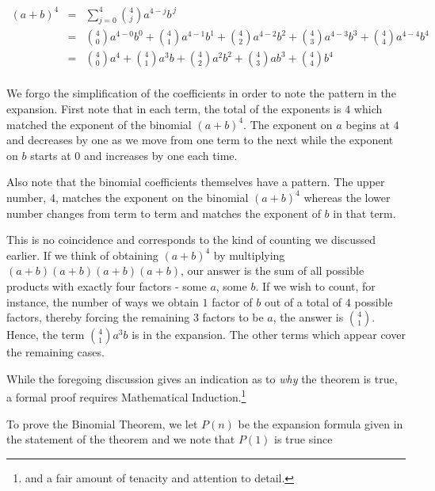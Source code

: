 \documentclass{ximera}
\begin{document}
\[ \begin{array}{rcl}

(a+b)^{4} & = & \displaystyle{\sum_{j=0}^{4} \binom{4}{j} a^{4-j} b^{\, j}} \\  
          & = & \displaystyle{\binom{4}{0}a^{4-0}b^{0} + \binom{4}{1}a^{4-1}b^{1} + \binom{4}{2}a^{4-2}b^{2} + \binom{4}{3}a^{4-3}b^{3} + \binom{4}{4}a^{4-4}b^{4}} \\   
          & = & \displaystyle{\binom{4}{0}a^{4} + \binom{4}{1}a^{3}b + \binom{4}{2}a^{2}b^{2} + \binom{4}{3}ab^{3} + \binom{4}{4}b^{4}} \\
          
\end{array} \] 

We forgo the simplification of the coefficients in order to note the pattern in the expansion.  First note that in each term, the total of the exponents is $4$ which matched the exponent of the binomial $(a+b)^{4}$.  The exponent on $a$ begins at $4$ and decreases by one as we move from one term to the next while the exponent on $b$ starts at $0$ and increases by one each time.  

 

Also note that the binomial coefficients themselves have a pattern. The upper number, $4$, matches the exponent on the binomial $(a+b)^4$ whereas the lower number changes from term to term and matches the exponent of $b$ in that term.  

 

This is no coincidence and corresponds to the kind of counting we discussed earlier.  If we think of obtaining $(a+b)^4$ by multiplying $(a+b)(a+b)(a+b)(a+b)$, our answer is the sum of all possible products with exactly four factors - some $a$, some $b$.  If we wish to count, for instance, the number of ways we obtain $1$ factor of $b$ out of a total of $4$ possible factors, thereby forcing the remaining $3$ factors to be $a$, the answer is $\binom{4}{1}$.  Hence, the term  $\binom{4}{1}a^{3}b$ is in the expansion.  The other terms which appear cover the remaining cases.  

 

While the foregoing discussion gives an indication as to \textit{why} the theorem is true, a formal proof requires Mathematical Induction.\footnote{and a fair amount of tenacity and attention to detail.}

\medskip

To prove the Binomial Theorem, we let $P(n)$ be the expansion formula given in the statement of the theorem and we note that $P(1)$ is true since
\end{document}
